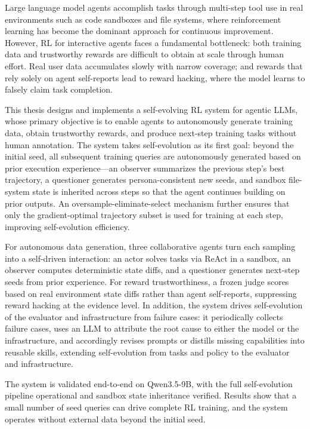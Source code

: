 
\begin{abstracten}

Large language model agents accomplish tasks through multi-step tool use in real environments such as code sandboxes and file systems, where reinforcement learning has become the dominant approach for continuous improvement. However, RL for interactive agents faces a fundamental bottleneck: both training data and trustworthy rewards are difficult to obtain at scale through human effort. Real user data accumulates slowly with narrow coverage; and rewards that rely solely on agent self-reports lead to reward hacking, where the model learns to falsely claim task completion.

This thesis designs and implements a self-evolving RL system for agentic LLMs, whose primary objective is to enable agents to autonomously generate training data, obtain trustworthy rewards, and produce next-step training tasks without human annotation. The system takes self-evolution as its first goal: beyond the initial seed, all subsequent training queries are autonomously generated based on prior execution experience—an observer summarizes the previous step's best trajectory, a questioner generates persona-consistent new seeds, and sandbox file-system state is inherited across steps so that the agent continues building on prior outputs. An oversample-eliminate-select mechanism further ensures that only the gradient-optimal trajectory subset is used for training at each step, improving self-evolution efficiency.

For autonomous data generation, three collaborative agents turn each sampling into a self-driven interaction: an actor solves tasks via ReAct in a sandbox, an observer computes deterministic state diffs, and a questioner generates next-step seeds from prior experience. For reward trustworthiness, a frozen judge scores based on real environment state diffs rather than agent self-reports, suppressing reward hacking at the evidence level. In addition, the system drives self-evolution of the evaluator and infrastructure from failure cases: it periodically collects failure cases, uses an LLM to attribute the root cause to either the model or the infrastructure, and accordingly revises prompts or distills missing capabilities into reusable skills, extending self-evolution from tasks and policy to the evaluator and infrastructure.

The system is validated end-to-end on Qwen3.5-9B, with the full self-evolution pipeline operational and sandbox state inheritance verified. Results show that a small number of seed queries can drive complete RL training, and the system operates without external data beyond the initial seed.

\end{abstracten}
